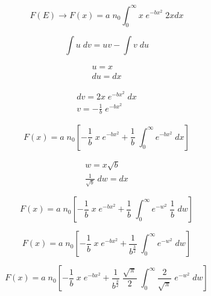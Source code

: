 \documentclass[11pt,a4paper]{article}
\begin{document}
\begin{equation}
    F(E) \rightarrow F(x) = a \; n_0 \int_0^\infty x \; e^{-bx^2} \; 2xdx
\end{equation}

\begin{equation*}
    \int u \; dv = uv - \int v \; du
\end{equation*}

\begin{equation*}
    \begin{gathered}
        u = x\\
        du = dx
    \end{gathered}
\end{equation*}

\begin{equation*}
    \begin{gathered}
        dv = 2x \; e^{-bx^2} \; dx\\
        v = -\frac{1}{b} \; e^{-bx^2}
    \end{gathered}
\end{equation*}

\begin{equation}
    F(x) = a \; n_0 [-\frac{1}{b} \; x \; e^{-bx^2} + \frac{1}{b} \; \int_0^{\infty} e^{-bx^2} \; dx]
\end{equation}

\begin{equation*}
    \begin{gathered}
        w = x\sqrt{b}\\
        \frac{1}{\sqrt{b}} \; dw = dx
    \end{gathered}
\end{equation*}

\begin{equation}
    F(x) = a \; n_0 [-\frac{1}{b} \; x \; e^{-bx^2} + \frac{1}{b} \; \int_0^{\infty} e^{-w^2} \; \frac{1}{b} \; dw]
\end{equation}

\begin{equation}
    F(x) = a \; n_0 [-\frac{1}{b} \; x \; e^{-bx^2} + \frac{1}{b^{\frac{3}{2}}} \; \int_0^{\infty} e^{-w^2} \; dw]
\end{equation}

\begin{equation}
    F(x) = a \; n_0 [-\frac{1}{b} \; x \; e^{-bx^2} + \frac{1}{b^{\frac{3}{2}}} \; \frac{\sqrt{\pi}}{2} \; \int_0^{\infty} \frac{2}{\sqrt{\pi}} \; e^{-w^2} \; dw]
\end{equation}
\end{document}
